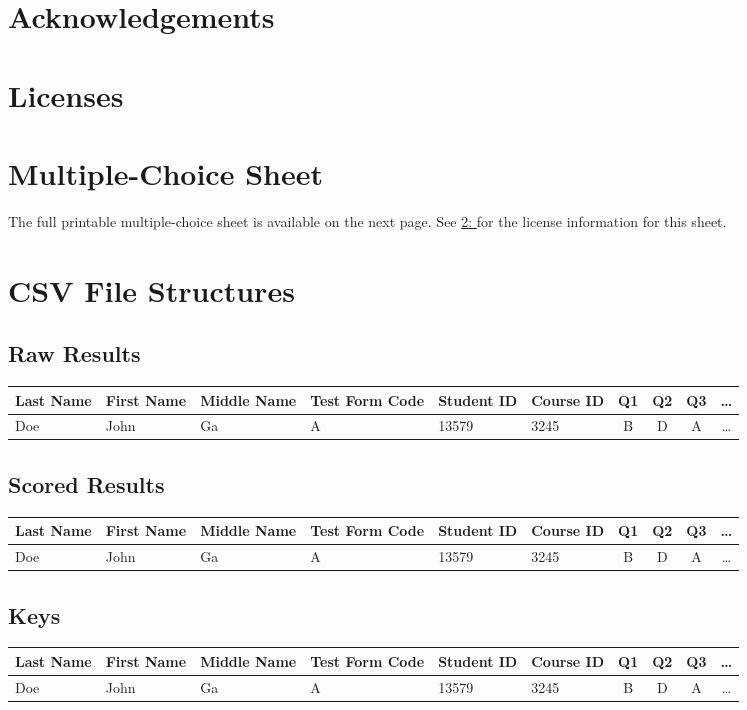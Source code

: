 \documentclass[12pt, letterpaper]{report}
\newcommand*{\sectref}[1]{\hypersetup{linkcolor=usfgreen}\hyperref[{#1}]{\ref*{#1}: \nameref*{#1}}}
\begin{document}
\begin{appendices}
\section{Acknowledgements}
\label{sect:acknowledgements}
\section{Licenses}
\label{sect:licenses}
\section{Multiple-Choice Sheet}
\label{sect:sheet}
The full printable multiple-choice sheet is available on the next page. See
\sectref{sect:licenses} for the license information for this sheet.
%
\section{CSV File Structures}
\subsection{Raw Results}
\label{sect:rawresults}
\begin{center}
  \begin{tabular}{ l | l | l | l | l | l | c | c | c | c }
    Last Name & First Name & Middle Name & Test Form Code & Student ID & Course ID & Q1 & Q2 & Q3 & \ldots \\
    \hline
    Doe & John & Ga & A & 13579 & 3245 & B & D & A & \ldots
  \end{tabular}
\end{center} 
\subsection{Scored Results}
\label{sect:scoredresults}
\begin{center}
  \begin{tabular}{ l | l | l | l | l | l | c | c | c | c }
    Last Name & First Name & Middle Name & Test Form Code & Student ID & Course ID & Q1 & Q2 & Q3 & \ldots \\
    \hline
    Doe & John & Ga & A & 13579 & 3245 & B & D & A & \ldots
  \end{tabular}
\end{center}
\subsection{Keys}
\label{sect:keys}
\begin{center}
  \begin{tabular}{ l | l | l | l | l | l | c | c | c | c }
    Last Name & First Name & Middle Name & Test Form Code & Student ID & Course ID & Q1 & Q2 & Q3 & \ldots \\
    \hline
    Doe & John & Ga & A & 13579 & 3245 & B & D & A & \ldots
  \end{tabular}
\end{center} 

\end{appendices}
\end{document}
